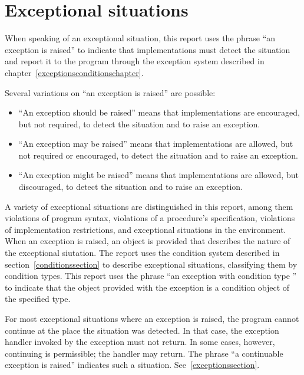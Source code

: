 \section{Exceptional situations}

 When speaking of an exceptional situation, this
report uses the phrase ``an exception is raised'' to indicate
that implementations must detect the situation and report it to the
program through the exception system described in
chapter~\ref{exceptionsconditionschapter}.

Several variations on ``an exception is raised'' are possible:

\begin{itemize}
\item ``An exception should be raised'' means that implementations
  are encouraged, but not required, to detect the situation
  and to raise an exception.

\item ``An exception may be raised'' means that implementations
are allowed, but not required or encouraged, to detect
the situation and to raise an exception.

\item ``An exception might be raised'' means that implementations
are allowed, but discouraged, to detect the situation
and to raise an exception.
\end{itemize}

A variety of exceptional situations are distinguished in this report,
among them violations of program syntax, violations of a procedure's
specification, violations of implementation restrictions, and
exceptional situations in the environment.  When an exception is
raised, an object is provided that describes the nature of the
exceptional siutation.  The report uses the condition system described
in section~\ref{conditionssection} to describe exceptional situations,
classifying them by condition types.  This report uses the phrase
``an exception with condition type '' to indicate
that the object provided with the exception is a condition object of
the specified type.

For most exceptional situations where an exception is raised, the
program cannot continue at the place the situation was detected.  In
that case, the exception handler invoked by the exception must not
return.  In some cases, however, continuing is permissible; the
handler may return.  The phrase ``a continuable
exception is raised'' indicates such a situation.
See~\ref{exceptionssection}.

